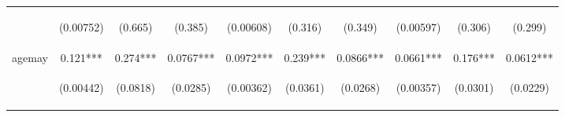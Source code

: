 \documentclass{article}[11pt,subeqn]
\begin{document}
\begin{spacing}{1.25}
\begin{sidewaystable}[!htbp]
\begin{center}
\begin{tabular}{lccccccccc}
\vspace{4pt} & \begin{footnotesize}(0.00752)\end{footnotesize} & \begin{footnotesize}(0.665)\end{footnotesize} & \begin{footnotesize}(0.385)\end{footnotesize} & \begin{footnotesize}(0.00608)\end{footnotesize} & \begin{footnotesize}(0.316)\end{footnotesize} & \begin{footnotesize}(0.349)\end{footnotesize} & \begin{footnotesize}(0.00597)\end{footnotesize} & \begin{footnotesize}(0.306)\end{footnotesize} & \begin{footnotesize}(0.299)\end{footnotesize} \\
agemay & 0.121*** & 0.274*** & 0.0767*** & 0.0972*** & 0.239*** & 0.0866*** & 0.0661*** & 0.176*** & 0.0612*** \\
\vspace{4pt} & \begin{footnotesize}(0.00442)\end{footnotesize} & \begin{footnotesize}(0.0818)\end{footnotesize} & \begin{footnotesize}(0.0285)\end{footnotesize} & \begin{footnotesize}(0.00362)\end{footnotesize} & \begin{footnotesize}(0.0361)\end{footnotesize} & \begin{footnotesize}(0.0268)\end{footnotesize} & \begin{footnotesize}(0.00357)\end{footnotesize} & \begin{footnotesize}(0.0301)\end{footnotesize} & \begin{footnotesize}(0.0229)\end{footnotesize} \\

\end{tabular}
\end{center}
\end{sidewaystable}
\end{spacing}
\end{document}
